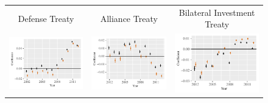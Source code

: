 \documentclass[reqno,onecolumn,letterpaper,12pt]{article}
\begin{document}
\begin{figure}[!h]
\begin{tabular}{@{\hskip -.05cm}c@{\hskip -.2cm}c@{\hskip -.2cm}c}
Defense Treaty &
Alliance Treaty &
Bilateral Investment Treaty \\

\includegraphics[height=.165\textheight, clip=true, trim=.5cm .5cm 0cm .1cm]{figures/main_rl_plots/Defense_Treaty.pdf}   &
\includegraphics[height=.165\textheight, clip=true, trim=.5cm .5cm 0cm .1cm]{figures/main_rl_plots/Non_Defense_Treaty.pdf} &
\includegraphics[height=.165\textheight, clip=true, trim=.5cm .5cm 0cm .1cm]{figures/main_rl_plots/Bilateral_Investment_Treaty.pdf}    \\




\end{tabular}
\end{figure}
\end{document}
